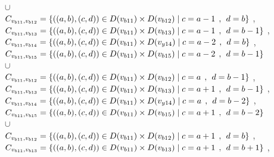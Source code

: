 \\$\cup$
\\$C_{v_{b11},v_{b12}}=\{((a,b),(c,d))\in D(v_{b11}) \times D(v_{b12})\mid c = a - 1\hspace{1ex} , \hspace{1ex}  d = b   \}$ , 
\\$C_{v_{b11},v_{b13}}=\{((a,b),(c,d))\in D(v_{b11}) \times D(v_{b13})\mid c = a - 1\hspace{1ex} , \hspace{1ex}  d = b - 1 \}$ , 
\\$C_{v_{b11},v_{b14}}=\{((a,b),(c,d))\in D(v_{b11}) \times D(v_{y14})\mid c = a - 2\hspace{1ex} , \hspace{1ex}  d = b   \}$ , 
\\$C_{v_{b11},v_{b15}}=\{((a,b),(c,d))\in D(v_{b11}) \times D(v_{b15})\mid c = a - 2\hspace{1ex} , \hspace{1ex}  d = b - 1 \}$  
\\$\cup$
\\$C_{v_{b11},v_{b12}}=\{((a,b),(c,d))\in D(v_{b11}) \times D(v_{b12})\mid c = a   \hspace{1ex} , \hspace{1ex}  d = b - 1 \}$ , 
\\$C_{v_{b11},v_{b13}}=\{((a,b),(c,d))\in D(v_{b11}) \times D(v_{b13})\mid c = a + 1\hspace{1ex} , \hspace{1ex}  d = b - 1 \}$ , 
\\$C_{v_{b11},v_{b14}}=\{((a,b),(c,d))\in D(v_{b11}) \times D(v_{y14})\mid c = a   \hspace{1ex} , \hspace{1ex}  d = b - 2 \}$ , 
\\$C_{v_{b11},v_{b15}}=\{((a,b),(c,d))\in D(v_{b11}) \times D(v_{b15})\mid c = a + 1\hspace{1ex} , \hspace{1ex}  d = b - 2 \}$  
\\$\cup$
\\$C_{v_{b11},v_{b12}}=\{((a,b),(c,d))\in D(v_{b11}) \times D(v_{b12})\mid c = a + 1\hspace{1ex} , \hspace{1ex}  d = b    \}$ , 
\\$C_{v_{b11},v_{b13}}=\{((a,b),(c,d))\in D(v_{b11}) \times D(v_{b13})\mid c = a + 1\hspace{1ex} , \hspace{1ex}  d = b + 1 \}$ , 
